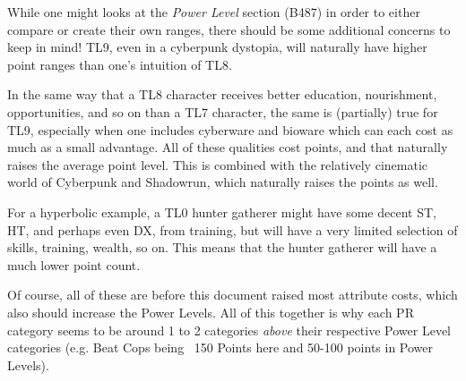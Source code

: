 \begin{multicols*}{2}
	While one might looks at the \textit{Power Level} section (B487) in order to either compare or create their own ranges, there should be some additional concerns to keep in mind! TL9, even in a cyberpunk dystopia, will naturally have higher point ranges than one's intuition of TL8. 
	
	In the same way that a TL8 character receives better education, nourishment, opportunities, and so on than a TL7 character, the same is (partially) true for TL9, especially when one includes cyberware and bioware which can each cost as much as a small advantage. All of these qualities cost points, and that naturally raises the average point level. This is combined with the relatively cinematic world of Cyberpunk and Shadowrun, which naturally raises the points as well.
	
	For a hyperbolic example, a TL0 hunter gatherer might have some decent ST, HT, and perhaps even DX, from training, but will have a very limited selection of skills, training, wealth, so on. This means that the hunter gatherer will have a much lower point count.	
	 
	 Of course, all of these are before this document raised most attribute costs, which also should increase the Power Levels. All of this together is why each PR category seems to be around 1 to 2 categories \textit{above} their respective Power Level categories (e.g. Beat Cops being ~150 Points here and 50-100 points in Power Levels).
	

\end{multicols*}
